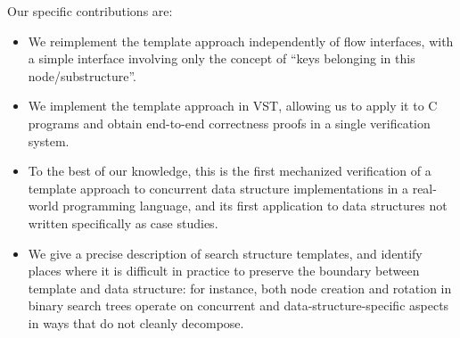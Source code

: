 \documentclass[sigplan,screen]{acmart}
\begin{document}
{Our specific contributions are:
\begin{itemize}
	\item We reimplement the template approach independently of flow interfaces, with a simple interface involving only the concept of ``keys belonging in this node/substructure''.
	\item We implement the template approach in VST, allowing us to apply it to C programs and obtain end-to-end correctness proofs in a single verification system.
	\item To the best of our knowledge, this is the first mechanized verification of a template approach to concurrent data structure implementations in a real-world programming language, and its first application to data structures not written specifically as case studies.
	\item We give a precise description of search structure templates, and identify places where it is difficult in practice to preserve the boundary between template and data structure: for instance, both node creation and rotation in binary search trees operate on concurrent and data-structure-specific aspects in ways that do not cleanly decompose.
\end{itemize}
}
\end{document}
